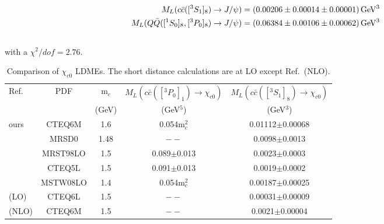 \documentclass[12pt,a4paper,final]{iopart}
\newcommand{\barQ}{{\bar{Q}}}
\newcommand{\barc}{{\bar{c}}}
\begin{document}
\begin{equation}
\begin{split}
M_{L}(c\barc([^3S_1]_{8})\rightarrow J/\psi)&= (0.00206\pm 0.00014 \pm {\color{black}0.00001}) \,{\rm GeV^3}\\
 M_{L}(Q\barQ([^1S_0]_{8},[^3P_0]_{8})\rightarrow J/\psi)&= (0.06384\pm 0.00106 \pm {\color{black}0.00062}) \,{\rm GeV^3} \\
~\label{eq:COLDME_JPsi}
\end{split}
\end{equation}
with a {\color{black}$\chi^2/dof=2.76$}.



\begin{table}[h]
\caption{Comparison of $\chi_{c0}$ LDMEs. The short distance calculations are at LO except Ref.~\cite{Jia:2014jfa}(NLO).}
\begin{tabular}{|l|c|c|c|c|}
\hline            
Ref.                             &PDF     &m$_{c}$      &$M_{L}(c\barc([^3P_0]_{1})\rightarrow \chi_{c0})$                     &$M_{L}(c\barc([^3S_1]_{8})\rightarrow \chi_{c0})$      \\        
                                &        &(GeV)       &(GeV$^5$)                        &(GeV$^3$)         \\
\hline
ours                           &CTEQ6M   &1.6         &0.054m$_{c}^{2}$                 &0.01112$\pm$0.00068\\
\cite{Cho:1995vh}              &MRSD0    &1.48        &$--$                            &0.0098$\pm$0.0013   \\
\cite{Braaten:1999qk}          &MRST98LO &1.5         &0.089$\pm$0.013                 &0.0023$\pm$0.0003    \\
\cite{Braaten:1999qk}          &CTEQ5L   &1.5         &0.091$\pm$0.013                 &0.0019$\pm$0.0002     \\
\cite{Sharma:2012dy}           &MSTW08LO &1.4         &0.054m$_{c}^{2}$                   &0.00187$\pm$0.00025     \\
\cite{Jia:2014jfa}(LO)         &CTEQ6L   &1.5         &$--$                            &0.00031$\pm$0.00009   \\ 
\cite{Jia:2014jfa}(NLO)        &CTEQ6M   &1.5         &$--$                            &0.0021$\pm$0.00004  \\ 
\hline
\end{tabular}
\label{table:LDMEChic0}
\end{table}
\end{document}
